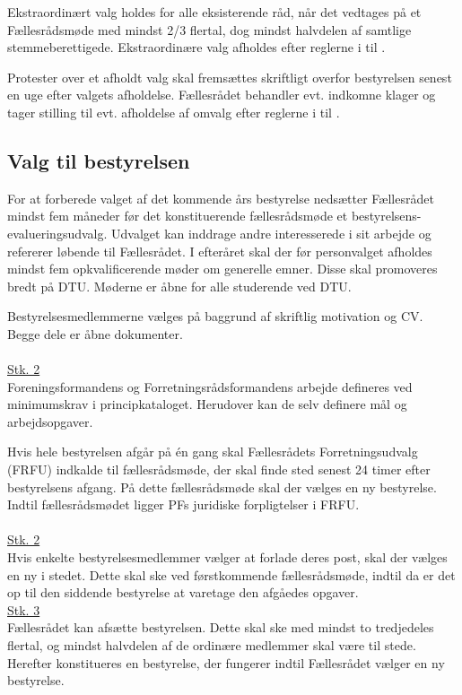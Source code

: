 \begin{list}
\item Ekstraordinært valg holdes for alle eksisterende råd, når det vedtages på et Fællesrådsmøde med mindst 2/3 flertal, dog mindst halvdelen af samtlige stemmeberettigede. Ekstraordinære valg afholdes efter reglerne i  til .

\item Protester over et afholdt valg skal fremsættes skriftligt overfor bestyrelsen senest en uge efter valgets afholdelse. Fællesrådet behandler evt. indkomne klager og tager stilling til evt. afholdelse af omvalg efter reglerne i  til .


\subsection{Valg til bestyrelsen} \label{S:kap:ValgTilBestyrelsen}
\item \label{S:bestyrelsen:BXX-eu valg} For at forberede valget af det kommende års bestyrelse nedsætter Fællesrådet mindst fem måneder før det konstituerende fællesrådsmøde et bestyrelsens-evalueringsudvalg. Udvalget kan inddrage andre interesserede i sit arbejde og refererer løbende til Fællesrådet. I efteråret skal der før personvalget afholdes mindst fem opkvalificerende møder om generelle emner. Disse skal promoveres bredt på DTU. Møderne er åbne for alle studerende ved DTU.

\item Bestyrelsesmedlemmerne vælges på baggrund af skriftlig motivation og CV. Begge dele er åbne dokumenter.\\
\\
\underline{Stk. 2}\\
Foreningsformandens og Forretningsrådsformandens arbejde defineres ved minimumskrav i principkataloget. Herudover kan de selv definere mål og arbejdsopgaver.\\

\item Hvis hele bestyrelsen afgår på én gang skal Fællesrådets Forretningsudvalg (FRFU) indkalde til fællesrådsmøde, der skal finde sted senest 24 timer efter bestyrelsens afgang. På dette fællesrådsmøde skal der vælges en ny bestyrelse. Indtil fællesrådsmødet ligger PFs juridiske forpligtelser i FRFU.\\
\\
\underline{Stk. 2}\\
Hvis enkelte bestyrelsesmedlemmer vælger at forlade deres post, skal der vælges en ny i stedet. Dette skal ske ved førstkommende fællesrådsmøde, indtil da er det op til den siddende bestyrelse at varetage den afgåedes opgaver.
\\
\underline{Stk. 3}\\
Fællesrådet kan afsætte bestyrelsen. Dette skal ske med mindst to tredjedeles flertal, og mindst halvdelen af de ordinære medlemmer skal være til stede. Herefter konstitueres en bestyrelse, der fungerer indtil Fællesrådet vælger en ny bestyrelse.


\end{list}
